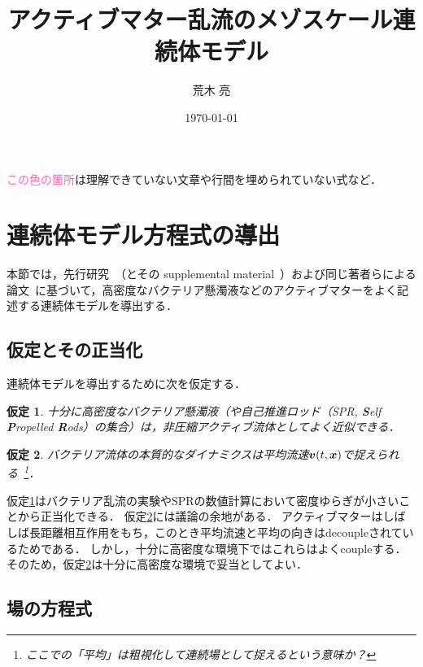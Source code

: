 \documentclass[12pt,dvipdfmx,svgnames,a4paper,uplatex]{ujarticle}
\title{アクティブマター乱流のメゾスケール連続体モデル}
\author{荒木 亮}
\date{\today}
\theoremstyle{plain}
\newtheorem{assumption}{仮定}
\begin{document}
\maketitle

\textcolor{HotPink}{この色の箇所}は理解できていない文章や行間を埋められていない式など．

\tableofcontents

\section{連続体モデル方程式の導出}
\label{sec:derive_continuous_model}

本節では，先行研究~\cite{Wensink2012b}（とその supplemental material~\cite{Wensink2012a}）および同じ著者らによる論文~\cite{Dunkel2013a}に基づいて，高密度なバクテリア懸濁液などのアクティブマターをよく記述する連続体モデルを導出する．


\subsection{仮定とその正当化}
\label{subsec:assumptions_justification}

連続体モデルを導出するために次を仮定する．

\begin{assumption}
  \label{as:incompressibility}
  十分に高密度なバクテリア懸濁液（や自己推進ロッド（SPR, \textbf{S}elf \textbf{P}ropelled \textbf{R}ods）の集合）は，非圧縮アクティブ流体としてよく近似できる．
\end{assumption}

\begin{assumption}
  \label{as:mean_velocity_field}
  バクテリア流体の本質的なダイナミクスは平均流速\(\vb*{v}(t,\vb*{x})\)で捉えられる~\footnote{ここでの「平均」は粗視化して連続場として捉えるという意味か？}．
\end{assumption}

仮定\ref{as:incompressibility}はバクテリア乱流の実験やSPRの数値計算において密度ゆらぎが小さいことから正当化できる．
仮定\ref{as:mean_velocity_field}には議論の余地がある．
アクティブマターはしばしば長距離相互作用をもち，このとき平均流速と平均の向きはdecoupleされているためである．
しかし，十分に高密度な環境下ではこれらはよくcoupleする．
そのため，仮定\ref{as:mean_velocity_field}は十分に高密度な環境で妥当としてよい．


\subsection{場の方程式}
\label{subsec:field_equation}
\end{document}
